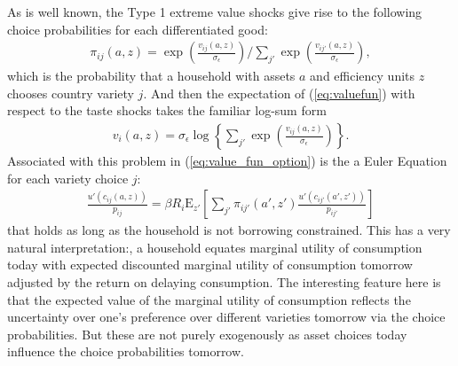 \documentclass[12pt,pdftex]{article}
\begin{document}
\begin{onehalfspacing}
As is well known, the Type 1 extreme value shocks give rise to the following choice probabilities for each differentiated good:
\begin{align}
\pi_{ij}(a, z) = \exp \left( \frac{ v_{ij}(a, z) }{\sigma_{\epsilon}} \right) \Bigg / \sum_{j'} \exp \left( \frac{ v_{ij'}(a, z) }{\sigma_{\epsilon}} \right), \label{eq:choice-prob}
\end{align}
which is the probability that a household with assets $a$ and efficiency units $z$ chooses country variety $j$. And then the expectation of (\ref{eq:valuefun}) with respect to the taste shocks takes the familiar log-sum form
\begin{align}
v_i(a, z) = \sigma_{\epsilon} \log \left\{ \sum_{j'} \exp \left( \frac{  v_{ij}(a, z)}{\sigma_{\epsilon}} \right) \right\}. \label{eq:log_sum}
\end{align}
Associated with this problem in (\ref{eq:value_fun_option}) is the a Euler Equation for each variety choice $j$:
\begin{align}
\frac{u'(c_{ij}(a, z))}{p_{ij}} = \beta R_{i} \mathrm{E}_{z'} \left[ \sum_{j'} \pi_{ij'}(a', z') \frac{u'(c_{ij'}(a', z'))}{p_{ij'}} \right]
\label{eq:euler_equation}
\end{align}
that holds as long as the household is not borrowing constrained. This has a very natural interpretation:, a household equates marginal utility of consumption today with expected discounted marginal utility of consumption tomorrow adjusted by the return on delaying consumption. The interesting feature here is that the expected value of the marginal utility of consumption reflects the uncertainty over one's preference over different varieties tomorrow via the choice probabilities. But these are not purely exogenously as asset choices today influence the choice probabilities tomorrow.


\end{onehalfspacing}
\end{document}
